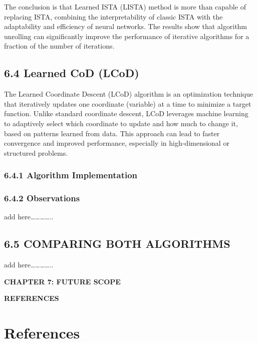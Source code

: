 \documentclass[
  letterpaper,
  DIV=11,
  numbers=noendperiod]{scrartcl}
\providecommand{\mainsection}[1]{\begin{center}{\rmfamily\textbf{\fontsize{14}{20}\selectfont #1}}\end{center}}
\begin{document}
The conclusion is that Learned ISTA (LISTA) method is more than capable
of replacing ISTA, combining the interpretability of classic ISTA with
the adaptability and efficiency of neural networks. The results show
that algorithm unrolling can significantly improve the performance of
iterative algorithms for a fraction of the number of iterations.

\subsection{6.4 Learned CoD (LCoD)}\label{learned-cod-lcod}

The Learned Coordinate Descent (LCoD) algorithm is an optimization
technique that iteratively updates one coordinate (variable) at a time
to minimize a target function. Unlike standard coordinate descent, LCoD
leverages machine learning to adaptively select which coordinate to
update and how much to change it, based on patterns learned from data.
This approach can lead to faster convergence and improved performance,
especially in high-dimensional or structured problems.

\subsubsection{6.4.1 Algorithm
Implementation}\label{algorithm-implementation-3}

\subsubsection{6.4.2 Observations}\label{observations}

add here\ldots\ldots\ldots\ldots..

\subsection{6.5 COMPARING BOTH
ALGORITHMS}\label{comparing-both-algorithms}

add here\ldots\ldots\ldots\ldots..

\newpage

\mainsection{CHAPTER 7: FUTURE SCOPE}

\newpage

\mainsection{REFERENCES}

\section{References}\label{references}
\end{document}
